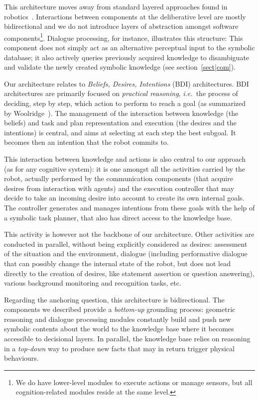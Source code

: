 \documentclass[preprint,3p,times]{elsarticle}
\newcommand{\ie}{{\textit{i.e.\ }}}
\begin{document}
This architecture moves away from standard layered approaches found in
robotics~\cite{Gat1998three, Volpe2001CLARAty, Goldberg2002}. Interactions
between components at the deliberative level are mostly bidirectional and we do
not introduce layers of abstraction amongst software components\footnote{We do
have lower-level modules to execute actions or manage sensors, but all
cognition-related modules reside at the same level.}. Dialogue processing, for
instance, illustrates this structure: This component does not simply act as an
alternative perceptual input to the symbolic database; it also
actively queries previously acquired knowledge to disambiguate and validate the
newly created symbolic knowledge (see section~\ref{sect|com}).

Our architecture relates to \emph{Beliefs, Desires, Intentions} (BDI)
architectures. BDI architectures are primarily focused on \emph{practical
reasoning}, \ie the process of deciding, step by step, which action to perform
to reach a goal (as summarized by Woolridge~\cite{Woolridge1999}). The
management of the interaction between knowledge (the beliefs) and task and plan
representation and execution (the desires and the intentions) is central, and
aims at selecting at each step the best subgoal. It becomes then an intention
that the robot commits to.

This interaction between knowledge and actions is also central to our approach
(as for any cognitive system): it is one amongst all the activities carried by
the robot, actually performed by the communication components (that acquire
desires from interaction with agents) and the execution controller that may
decide to take an incoming desire into account to create its own internal
goals. The controller generates and manages intentions from these goals with
the help of a symbolic task planner, that also has direct access to the
knowledge base.

This activity is however not the backbone of our architecture. Other
activities are conducted in parallel, without being explicitly considered as
desires: assessment of the situation and the environment, dialogue (including
performative dialogue that can possibly change the internal state of the robot,
but does not lead directly to the creation of desires, like statement assertion or
question answering), various background monitoring and recognition tasks, etc.

Regarding the anchoring question, this architecture is bidirectional. The
components we described provide a \textit{bottom-up} grounding process:
geometric reasoning and dialogue processing modules constantly build and push
new symbolic contents about the world to the knowledge base where it becomes
accessible to decisional layers. In parallel, the knowledge base relies on
reasoning in a \textit{top-down} way to produce new facts that may in return
trigger physical behaviours.
\end{document}
